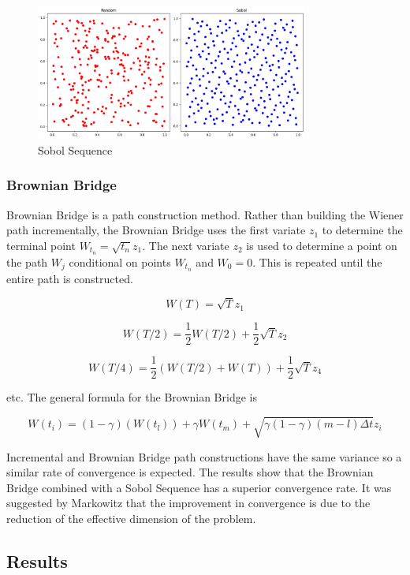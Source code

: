 \documentclass{article}
\newcommand{\para}{\vspace{8pt}} %
\begin{document}
\begin{figure}[ht]
    \centering
    \includegraphics[width=0.8\textwidth]{images/sobol.png}
    \caption{Sobol Sequence}
    \label{fig:sobol}
\end{figure}

\subsubsection{Brownian Bridge}

Brownian Bridge is a path construction method. Rather than building the Wiener path incrementally, the Brownian Bridge uses
the first variate $z_1$ to determine the terminal point $W_{t_n} = \sqrt{t_n}z_1$. The next variate $z_2$ is used to determine a 
point on the path $W_j$ conditional on points $W_{t_n}$ and $W_0=0$. This is repeated until the entire path is constructed. 

\[
W(T) = \sqrt{T}z_1
\]

\[
W(T/2) = \frac{1}{2}W(T/2) + \frac{1}{2}\sqrt{T}z_2
\]

\[
W(T/4) = \frac{1}{2}(W(T/2) + W(T)) + \frac{1}{2}\sqrt{T}z_4
\]

etc. The general formula for the Brownian Bridge is

\[
W(t_i) = (1 - \gamma)(W(t_l)) + \gamma W(t_m) + \sqrt{\gamma(1-\gamma)(m-l)\Delta t}z_i
\]

\para
Incremental and Brownian Bridge path constructions have the same variance so a similar rate of convergence is expected. The results show that 
the Brownian Bridge combined with a Sobol Sequence has a superior convergence rate. It was suggested by Markowitz\cite{markowitz} 
that the improvement in convergence is due to the reduction of the effective dimension of the problem.

\subsection{Results}
\end{document}
